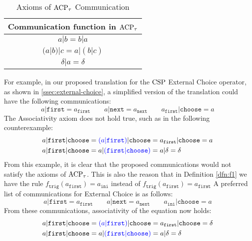 \documentclass[../hons_project.tex]{subfiles}
\begin{document}
\begin{table}[ht!]
	\centering
	\begin{tabular}{ |c| }
		\hline
		\textbf{Communication function in $\mathrm{ACP}_{\tau}$} \\
		\hline
		$a | b = b | a$                            \\
		$(a | b) | c = a | (b | c)$                \\
		$\delta | a = \delta$                      \\
		\hline
	\end{tabular}
	\caption{Axioms of $\mathrm{ACP}_{\tau}$ Communication}
	\label{table:acpt-communication}
\end{table}

\vspace{-10pt}
For example, in our proposed translation for the $\mathrm{CSP}$ External Choice operator, as shown in \cref{ssec:external-choice}, a simplified version of the translation could have the following communications:
\[a | \mathtt{first} = a_{\mathtt{first}} \qquad a | \mathtt{next} = a_{\mathtt{next}} \qquad a_{\mathtt{first}} | \mathtt{choose} = a\]
The Associativity axiom does not hold true, such as in the following counterexample:
\begin{align*}
	a | \mathtt{first} | \mathtt{choose} & = {\color{blue}(a | \mathtt{first})} | \mathtt{choose} = a_{\mathtt{first}} | \mathtt{choose} = a \\
	 a | \mathtt{first} | \mathtt{choose}                                    & = a | {\color{blue}(\mathtt{first} | \mathtt{choose})} = a | \delta = \delta
\end{align*}
From this example, it is clear that the proposed communications would not satisfy the axioms of $\mathrm{ACP}_{\tau}$. This is also the reason that in Definition \ref{dfn:f1} we have the rule
$f_{\mathtt{trig}}(a_{\mathtt{first}}) = a_{\mathtt{ini}}$ instead of $f_{\mathtt{trig}}(a_{\mathtt{first}}) = a_{\mathtt{first}}$
A preferred list of communications for External Choice is as follows:
\[a | \mathtt{first} = a_{\mathtt{first}} \qquad a | \mathtt{next} = a_{\mathtt{next}} \qquad a_{\mathtt{ini}} | \mathtt{choose} = a\]
From these communications, associativity of the equation now holds:
\begin{align*}
	a | \mathtt{first} | \mathtt{choose} & = {\color{blue}(a | \mathtt{first})} | \mathtt{choose} = a_{\mathtt{first}} | \mathtt{choose} = \delta \\
	a | \mathtt{first} | \mathtt{choose} & = a | {\color{blue}(\mathtt{first} | \mathtt{choose})} = a | \delta = \delta
\end{align*}
\end{document}
